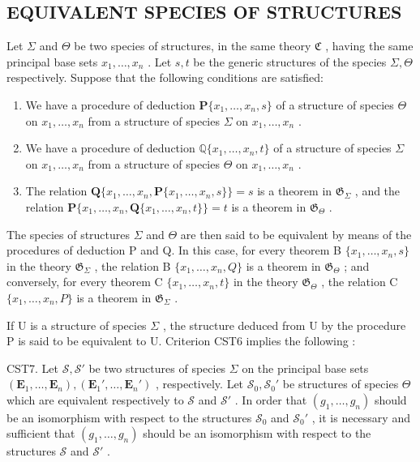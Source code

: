 \subsection{EQUIVALENT SPECIES OF STRUCTURES}

Let \(\Sigma\) and \(\Theta\) be two species of structures, in the same theory \(\mathfrak{C}\) , having the same principal base sets \(x_{1},\ldots ,x_{n}\) . Let \(s,t\) be the generic structures of the species \(\Sigma,\Theta\) respectively. Suppose that the following conditions are satisfied:

\begin{enumerate}
\def\labelenumi{(\arabic{enumi})}
\item
  We have a procedure of deduction \(\mathbf{P}\{x_1, \ldots, x_n, s\}\) of a structure of species \(\Theta\) on \(x_1, \ldots, x_n\) from a structure of species \(\Sigma\) on \(x_1, \ldots, x_n\) .
\item
  We have a procedure of deduction \(\mathbb{Q}\{x_1, \ldots, x_n, t\}\) of a structure of species \(\Sigma\) on \(x_1, \ldots, x_n\) from a structure of species \(\Theta\) on \(x_1, \ldots, x_n\) .
\item
  The relation \(\mathbf{Q}\{x_1, \ldots, x_n, \mathbf{P}\{x_1, \ldots, x_n, s\}\} = s\) is a theorem in \(\mathfrak{G}_{\Sigma}\) , and the relation \(\mathbf{P}\{x_1, \ldots, x_n, \mathbf{Q}\{x_1, \ldots, x_n, t\}\} = t\) is a theorem in \(\mathfrak{G}_{\Theta}\) .
\end{enumerate}

The species of structures \(\Sigma\) and \(\Theta\) are then said to be equivalent by means of the procedures of deduction P and Q. In this case, for every theorem B \(\{x_1, \ldots, x_n, s\}\) in the theory \(\mathfrak{G}_{\Sigma}\) , the relation B \(\{x_1, \ldots, x_n, Q\}\) is a theorem in \(\mathfrak{G}_{\Theta}\) ; and conversely, for every theorem C \(\{x_1, \ldots, x_n, t\}\) in the theory \(\mathfrak{G}_{\Theta}\) , the relation C \(\{x_1, \ldots, x_n, P\}\) is a theorem in \(\mathfrak{G}_{\Sigma}\) .

If U is a structure of species \(\Sigma\) , the structure deduced from U by the procedure P is said to be equivalent to U. Criterion CST6 implies the following :

CST7. Let \(\mathcal{S},\mathcal{S}'\) be two structures of species \(\Sigma\) on the principal base sets \((\mathbf{E}_1,\ldots ,\mathbf{E}_n),(\mathbf{E}_1',\ldots ,\mathbf{E}_n')\) , respectively. Let \(\mathcal{S}_0,\mathcal{S}_0'\) be structures of species \(\Theta\) which are equivalent respectively to \(\mathcal{S}\) and \(\mathcal{S}'\) . In order that \((g_1,\dots,g_n)\) should be an isomorphism with respect to the structures \(\mathcal{S}_0\) and \(\mathcal{S}_0'\) , it is necessary and sufficient that \((g_1,\dots,g_n)\) should be an isomorphism with respect to the structures \(\mathcal{S}\) and \(\mathcal{S}'\) .

